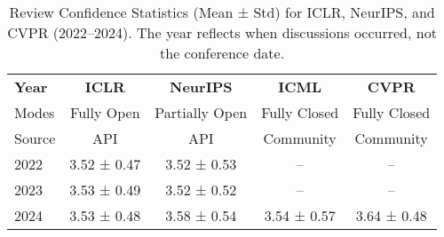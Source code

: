 
\begin{table}[h!]
\centering
\small
\begin{tabular}{lcccc}
\toprule
\textbf{Year} & \textbf{ICLR} & \textbf{NeurIPS} & \textbf{ICML} & \textbf{CVPR} \\
{\scriptsize Modes} & {\scriptsize Fully Open} & {\scriptsize Partially Open} & {\scriptsize Fully Closed} & {\scriptsize Fully Closed} \\
{\scriptsize Source} & {\scriptsize API} & {\scriptsize API} & {\scriptsize Community} & {\scriptsize Community} \\
\midrule
2022 & 3.52 ± 0.47 & 3.52 ± 0.53 & -- & -- \\
2023 & 3.53 ± 0.49 & 3.52 ± 0.52 & -- & -- \\
2024 & 3.53 ± 0.48 & 3.58 ± 0.54 & 3.54 ± 0.57 & 3.64 ± 0.48 \\
\bottomrule
\end{tabular}
\caption{Review Confidence Statistics (Mean ± Std) for ICLR, NeurIPS, and CVPR (2022–2024). The year reflects when discussions occurred, not the conference date.}
\vspace{-5pt}
\label{tab:review_confidence}
\end{table}
